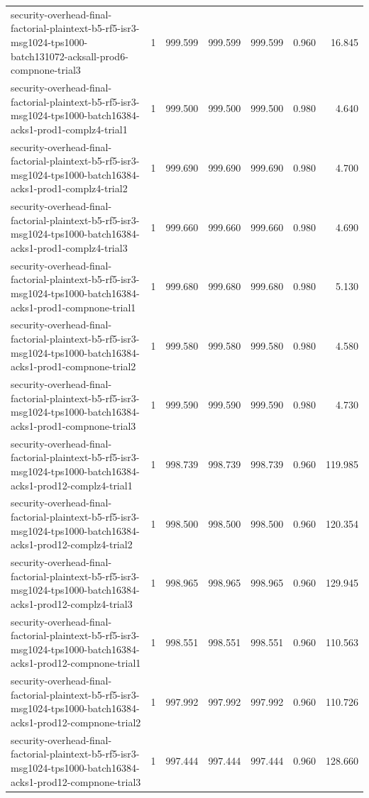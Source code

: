 \begin{tabular}{lrrrrrr}
security-overhead-final-factorial-plaintext-b5-rf5-isr3-msg1024-tps1000-batch131072-acksall-prod6-compnone-trial3 & 1 & 999.599 & 999.599 & 999.599 & 0.960 & 16.845 \\
security-overhead-final-factorial-plaintext-b5-rf5-isr3-msg1024-tps1000-batch16384-acks1-prod1-complz4-trial1 & 1 & 999.500 & 999.500 & 999.500 & 0.980 & 4.640 \\
security-overhead-final-factorial-plaintext-b5-rf5-isr3-msg1024-tps1000-batch16384-acks1-prod1-complz4-trial2 & 1 & 999.690 & 999.690 & 999.690 & 0.980 & 4.700 \\
security-overhead-final-factorial-plaintext-b5-rf5-isr3-msg1024-tps1000-batch16384-acks1-prod1-complz4-trial3 & 1 & 999.660 & 999.660 & 999.660 & 0.980 & 4.690 \\
security-overhead-final-factorial-plaintext-b5-rf5-isr3-msg1024-tps1000-batch16384-acks1-prod1-compnone-trial1 & 1 & 999.680 & 999.680 & 999.680 & 0.980 & 5.130 \\
security-overhead-final-factorial-plaintext-b5-rf5-isr3-msg1024-tps1000-batch16384-acks1-prod1-compnone-trial2 & 1 & 999.580 & 999.580 & 999.580 & 0.980 & 4.580 \\
security-overhead-final-factorial-plaintext-b5-rf5-isr3-msg1024-tps1000-batch16384-acks1-prod1-compnone-trial3 & 1 & 999.590 & 999.590 & 999.590 & 0.980 & 4.730 \\
security-overhead-final-factorial-plaintext-b5-rf5-isr3-msg1024-tps1000-batch16384-acks1-prod12-complz4-trial1 & 1 & 998.739 & 998.739 & 998.739 & 0.960 & 119.985 \\
security-overhead-final-factorial-plaintext-b5-rf5-isr3-msg1024-tps1000-batch16384-acks1-prod12-complz4-trial2 & 1 & 998.500 & 998.500 & 998.500 & 0.960 & 120.354 \\
security-overhead-final-factorial-plaintext-b5-rf5-isr3-msg1024-tps1000-batch16384-acks1-prod12-complz4-trial3 & 1 & 998.965 & 998.965 & 998.965 & 0.960 & 129.945 \\
security-overhead-final-factorial-plaintext-b5-rf5-isr3-msg1024-tps1000-batch16384-acks1-prod12-compnone-trial1 & 1 & 998.551 & 998.551 & 998.551 & 0.960 & 110.563 \\
security-overhead-final-factorial-plaintext-b5-rf5-isr3-msg1024-tps1000-batch16384-acks1-prod12-compnone-trial2 & 1 & 997.992 & 997.992 & 997.992 & 0.960 & 110.726 \\
security-overhead-final-factorial-plaintext-b5-rf5-isr3-msg1024-tps1000-batch16384-acks1-prod12-compnone-trial3 & 1 & 997.444 & 997.444 & 997.444 & 0.960 & 128.660 \\

\end{tabular}
